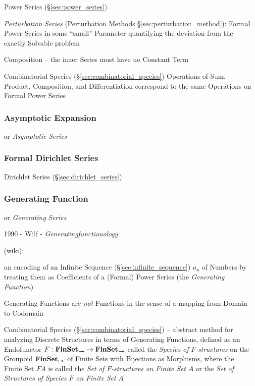 \fist Power Series (\S\ref{sec:power_series})

\fist \emph{Perturbation Series} (Perturbation Methods
\S\ref{sec:perturbation_method}): Formal Power Series in some ``small''
Parameter quantifying the deviation from the exactly Solvable problem

Composition -- the inner Series must have no Constant Term

Combinatorial Species (\S\ref{sec:combinatorial_species}) Operations of Sum,
Product, Composition, and Differentiation correspond to the same Operations on
Formal Power Series



\subsubsection{Asymptotic Expansion}\label{sec:asymptotic_expansion}

or \emph{Asymptotic Series}



\subsubsection{Formal Dirichlet Series}\label{sec:formal_dirichlet_series}

Dirichlet Series (\S\ref{sec:dirichlet_series})



\subsubsection{Generating Function}\label{sec:generating_function}

or \emph{Generating Series}

1990 - Wilf - \emph{Generatingfunctionology}

(wiki):

an encoding of an Infinite Sequence (\S\ref{sec:infinite_sequence}) $a_n$ of
Numbers by treating them as Coefficients of a (Formal) Power Series (the
\emph{Generating Function})

Generating Functions are \emph{not} Functions in the sense of a mapping from
Domain to Codomain

\fist Combinatorial Species (\S\ref{sec:combinatorial_species}) -- abstract
method for analyzing Discrete Structures in terms of Generating Functions,
defined as an Endofunctor $F : \mathbf{FinSet}_{\rightarrowtail\hspace{-8pt}\twoheadrightarrow} \rightarrow
\mathbf{FinSet}_{\rightarrowtail\hspace{-8pt}\twoheadrightarrow}$ called the \emph{Species of $F$-structures} on the
Groupoid $\mathbf{FinSet}_{\rightarrowtail\hspace{-8pt}\twoheadrightarrow}$ of Finite Sets with Bijections as Morphisms,
where the Finite Set $F A$ is called the \emph{Set of $F$-structures on Finite
  Set $A$} or the \emph{Set of Structures of Species $F$ on Finite Set $A$}

